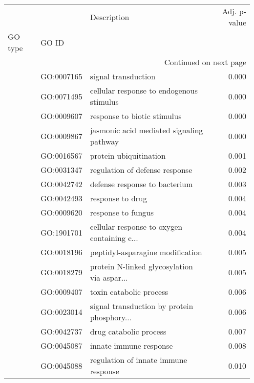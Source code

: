 \begin{longtable}{lllr}
\toprule
   &            &                                  Description &  Adj. p-value \\
GO type & GO ID &                                              &               \\
\midrule
\endhead
\midrule
\multicolumn{4}{r}{{Continued on next page}} \\
\midrule
\endfoot

\bottomrule
\endlastfoot
\multirow{86}{*}{BP} & GO:0007165 &                          signal transduction &         0.000 \\
   & GO:0071495 &     cellular response to endogenous stimulus &         0.000 \\
   & GO:0009607 &                  response to biotic stimulus &         0.000 \\
   & GO:0009867 &     jasmonic acid mediated signaling pathway &         0.000 \\
   & GO:0016567 &                       protein ubiquitination &         0.001 \\
   & GO:0031347 &               regulation of defense response &         0.002 \\
   & GO:0042742 &                defense response to bacterium &         0.003 \\
   & GO:0042493 &                             response to drug &         0.004 \\
   & GO:0009620 &                           response to fungus &         0.004 \\
   & GO:1901701 &  cellular response to oxygen-containing c... &         0.004 \\
   & GO:0018196 &             peptidyl-asparagine modification &         0.005 \\
   & GO:0018279 &  protein N-linked glycosylation via aspar... &         0.005 \\
   & GO:0009407 &                      toxin catabolic process &         0.006 \\
   & GO:0023014 &  signal transduction by protein phosphory... &         0.006 \\
   & GO:0042737 &                       drug catabolic process &         0.007 \\
   & GO:0045087 &                       innate immune response &         0.008 \\
   & GO:0045088 &         regulation of innate immune response &         0.010 \\

\end{longtable}
